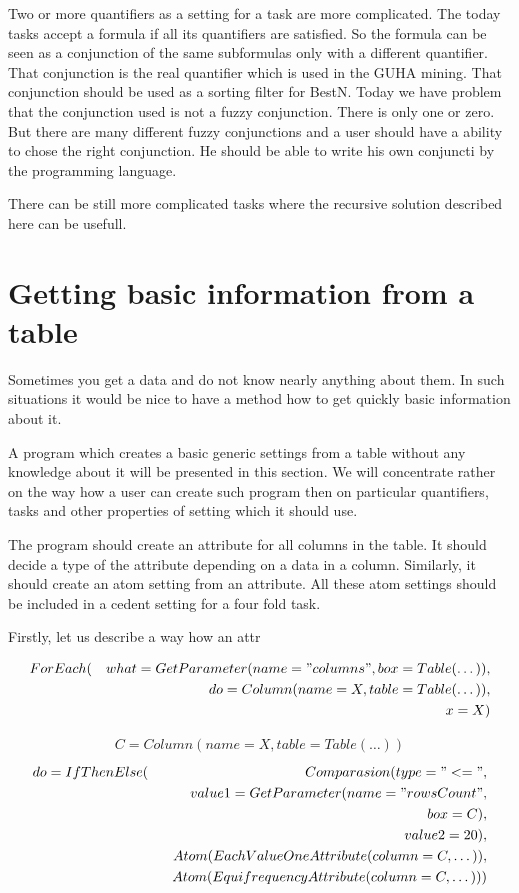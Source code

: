 \documentclass[a4paper,12pt]{book}
\begin{document}
Two or more quantifiers as a setting for a task are more complicated. The today tasks accept a formula if all its quantifiers are satisfied. So the formula can be seen as a conjunction of the same subformulas only with a different quantifier. That conjunction is the real quantifier which is used in the GUHA mining. That conjunction should be used as a sorting filter for BestN. Today we have problem that the conjunction used is not a fuzzy conjunction. There is only one or zero. But there are many different fuzzy conjunctions and a user should have a ability to chose the right conjunction. He should be able to write his own conjuncti by the programming language.

There can be still more complicated tasks where the recursive solution described here can be usefull. 

\section{Getting basic information from a table}
Sometimes you get a data and do not know nearly anything about them. In such situations it would be nice to have a method how to get quickly basic information about it.

A program which creates a basic generic settings from a table without any knowledge about it will be presented in this section. We will concentrate rather on the way how a user can create such program then on particular quantifiers, tasks and other properties of setting which it should use.

The program should create an attribute for all columns in the table. It should decide a type of the attribute depending on a data in a column. Similarly, it should create an atom setting from an attribute. All these atom settings should be included in a cedent setting for a four fold task.

Firstly, let us describe a way how an attr

\begin{eqnarray*}
ForEach(&&what=GetParameter(name="columns", box=Table(\dots)), \\&& do=Column(name=X, table=Table(\dots)), \\&& x=X)
\end{eqnarray*}


\begin{eqnarray*}
C=Column(name=X, table=Table(\dots))
\end{eqnarray*}
\begin{eqnarray*}
do=IfThenElse(&&Comparasion(type="<=", \\&&\qquad value1=GetParameter(name="rowsCount", \\&&\qquad\qquad box=C), \\&&\qquad value2=20),\\&&Atom(EachValueOneAttribute(column=C,\dots)),\\&&Atom(EquifrequencyAttribute(column=C,\dots)))
\end{eqnarray*}
\end{document}
